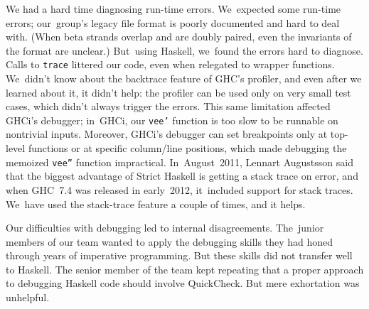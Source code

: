 \documentclass[]{jfp1}
\newcommand\seclabel[1]{\label{sec:#1}}
\begin{document}
We had a hard time diagnosing run-time errors.
We~expected some run-time errors;
our~group's legacy file
format is poorly documented and hard to deal with.
(When beta
strands overlap and are doubly paired, even the invariants of the
format are unclear.)
But~using Haskell, we~found the errors hard to diagnose.
Calls to
\texttt{trace} 
littered our code,
even when relegated to wrapper functions.
We~didn't know about the backtrace feature of GHC's profiler,
and even after we learned about it, it didn't help:
the profiler can be used only on very small test cases,
which didn't always trigger the errors.
This same limitation affected GHCi's debugger; 
in~GHCi, our \texttt{vee'} function
is too slow to be runnable on nontrivial
inputs.
Moreover,  GHCi's debugger can set breakpoints only at top-level functions
or at specific column/line positions, which made debugging the memoized
\texttt{vee''} function impractical.
In~August~2011, 
Lennart Augustsson said that the biggest advantage of Strict
Haskell is getting a stack trace on error,
and when GHC~7.4 was released in early~2012, it~included support for
stack traces. 
We~have used the stack-trace feature a couple of times, and it helps.


Our difficulties with debugging led to internal disagreements.
The~junior members of our team wanted to apply the debugging
skills they had honed through years of imperative programming.
But these skills did not transfer well to Haskell.
The senior member of the team kept repeating that a proper approach to
debugging Haskell code should involve QuickCheck.
But mere exhortation was unhelpful.

\seclabel{awkward-quickcheck}
\end{document}
